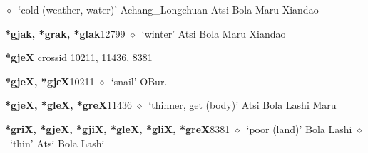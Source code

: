 \begin{list}{}{\leftmargin=1.5em \itemindent=-1.5em}
\hspace{1ex}
         $\diamond$~`cold (weather, water)'
         Achang\_Longchuan 
\hspace{1ex}
         Atsi 
\hspace{1ex}
         Bola 
\hspace{1ex}
         Maru 
\hspace{1ex}
         Xiandao 
  \item {\footnotesize \textbf{*gjak, *grak, *glak}}{\tiny 12799}
\hspace{1ex}
         $\diamond$~`winter'
         Atsi 
\hspace{1ex}
         Bola 
\hspace{1ex}
         Maru 
\hspace{1ex}
         Xiandao 
  \end{list}
\item
\textbf{*gjeX}
  {\tiny crossid 10211, 11436, 8381}
  \begin{list}{}{\leftmargin=1.5em \itemindent=-1.5em}
  \item {\footnotesize \textbf{*gjeX, *gjɛX}}{\tiny 10211}
         $\diamond$~`snail'
         OBur. 
  \item {\footnotesize \textbf{*gjeX, *gleX, *greX}}{\tiny 11436}
\hspace{1ex}
         $\diamond$~`thinner, get (body)'
         Atsi 
\hspace{1ex}
         Bola 
\hspace{1ex}
         Lashi 
\hspace{1ex}
         Maru 
  \item {\footnotesize \textbf{*griX, *gjeX, *gjiX, *gleX, *gliX, *greX}}{\tiny 8381}
\hspace{1ex}
         $\diamond$~`poor (land)'
         Bola 
\hspace{1ex}
         Lashi 
\hspace{1ex}
         $\diamond$~`thin'
         Atsi 
\hspace{1ex}
         Bola 
\hspace{1ex}
         Lashi 
  \end{list}
